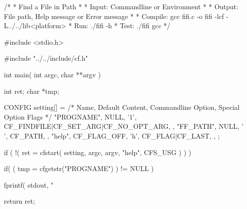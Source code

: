 
\begin{DoxyCodeInclude}

/*
 *    Find a File in Path
 *
 *    Input:  Commandline or Environment
 *
 *    Output: File path, Help message or Error message
 *
 *    Compile: gcc fifi.c -o fifi -lcf -L../../lib<platform>
 *    Run:     ./fifi -h
 *    Test:    ./fifi gcc
 */

#include <stdio.h>

#include "../../include/cf.h"

int main( int argc, char **argv )
{
    int ret; char *tmp;

    CONFIG setting[] =
    {
        /* Name, Default Content, Commandline Option, Special Option Flags */
        { "PROGNAME", NULL,        '1', CF_FINDFILE|CF_SET_ARG|CF_NO_OPT_ARG, }
      ,
        { "FF_PATH",  NULL,        ' ', CF_PATH,                              }
      ,
        { "help",     CF_FLAG_OFF, 'h', CF_FLAG|CF_LAST,                      }
      ,
    };

    if ( !( ret = cfstart( setting, argc, argv, "help", CFS_USG ) ) ){

        if( ( tmp = cfgetstr("PROGNAME") ) != NULL )

            fprintf( stdout, "%
    }

    return ret;
}
\end{DoxyCodeInclude}
 